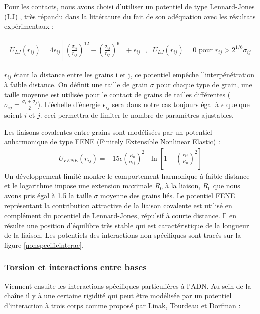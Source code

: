 Pour les contacts, nous avons choisi d'utiliser un potentiel de type Lennard-Jones (LJ) \cite{Jones1924}, très répandu dans la littérature du fait de son adéquation avec les résultats expérimentaux \cite{Bouanich1992}:

\begin{eqnarray}
U_{LJ}(r_{ij})= 4\epsilon_{ij} \left[\left(\frac{\sigma_{ij}}{r_{ij}}\right)^{12}-\left(\frac{\sigma_{ij}}{r_{ij}}\right)^{6}\right] + \epsilon_{ij} \text{ }, \text{ } U_{LJ}(r_{ij})=0 \text{ pour }  r_{ij}> 2^{1/6}\sigma_{ij}
\end{eqnarray}

\noindent $r_{ij}$ étant la distance entre les grains i et j, ce potentiel empêche l'interpénétration à faible distance. On définit une taille de grain $\sigma$ pour chaque type de grain, une taille moyenne est utilisée pour le contact de grains de tailles différentes ($\sigma_{ij}=\frac{\sigma_i+\sigma_j}{2}$). L'échelle d'énergie $\epsilon_{ij}$ sera dans notre cas toujours égal à $\epsilon$ quelque soient $i$ et $j$. ceci permettra de limiter le nombre de paramètres ajustables.

Les liaisons covalentes entre grains sont modélisées par un potentiel anharmonique de type FENE (Finitely Extensible Nonlinear Elastic) :
\begin{eqnarray}
U_{FENE}(r_{ij})= -15\epsilon \left(\frac{R_0}{\sigma_{ij}}\right)^2\text{ } \ln\left[1-\left(\frac{r_{ij}}{R_0}\right)^2\right]
\end{eqnarray}
Un développement limité montre le comportement harmonique à faible distance et le logarithme impose une extension maximale $R_0$ à la liaison, $R_0$ que nous avons pris égal à 1.5 la taille $\sigma$ moyenne des grains liés. Le potentiel FENE représentant la contribution attractive de la liaison covalente est utilisé en complément du potentiel de Lennard-Jones, répulsif à courte distance. Il en résulte une position d'équilibre très stable qui est caractéristique de la longueur de la liaison. Les potentiels des interactions non spécifiques sont tracés sur la figure \ref{nonspecificinterac}.

\subsubsection{Torsion et interactions entre bases}

Viennent ensuite les interactions spécifiques particulières à l'ADN. Au sein de la chaîne il y à une certaine rigidité qui peut être modélisée par un potentiel d'interaction à trois corps comme proposé par Linak, Tourdeau et Dorfman \cite{jchem}: 

